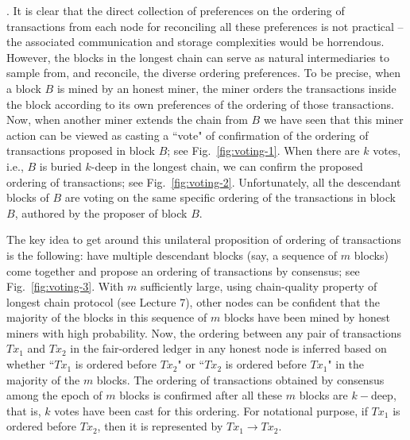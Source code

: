 \documentclass{article}
\begin{document}
. It is clear that the direct collection of preferences on the ordering of transactions from each node for reconciling all these preferences is not practical --  the associated communication and storage complexities would be horrendous. However, the blocks in the longest chain can serve as  natural intermediaries to sample from, and reconcile,  the diverse ordering preferences. To be precise, when a block $B$ is mined by an honest miner, the miner orders the transactions inside the block according to its own preferences of the ordering of those transactions. Now, when another miner extends the chain from $B$ we have seen that this miner action can be viewed as   casting a ``vote" of confirmation of the ordering of transactions proposed in block $B$; see Fig.~\ref{fig:voting-1}. When there are $k$ votes, i.e., $B$ is buried $k$-deep in the longest chain, we can confirm the proposed ordering of transactions; see  Fig.~\ref{fig:voting-2}.  Unfortunately, all the descendant blocks of $B$ are voting on the same specific ordering of the transactions in block $B$, authored by the proposer of block $B$. 

The key idea to get around this unilateral proposition of ordering of transactions is the following:  have multiple descendant blocks (say, a sequence of $m$ blocks) come together and propose an ordering of transactions by consensus; see Fig.~\ref{fig:voting-3}. With $m$ sufficiently large, using chain-quality property of longest chain protocol (see Lecture 7), other nodes can be confident that the majority of the blocks in this sequence of $m$ blocks have been mined by honest miners with high probability. Now, the ordering between any pair of transactions $Tx_1$ and $Tx_2$ in the fair-ordered ledger in any honest node is inferred based on whether ``$Tx_1$ is ordered before $Tx_2$" or ``$Tx_2$ is ordered before $Tx_1$" in the majority of the $m$ blocks. The ordering of transactions obtained by consensus among the epoch of $m$ blocks is confirmed after all these $m$ blocks are $k-$deep, that is, $k$ votes have been cast for this ordering. For notational purpose, if $Tx_1$ is ordered before $Tx_2$, then it is represented by $Tx_1 \rightarrow Tx_2$.
\end{document}
